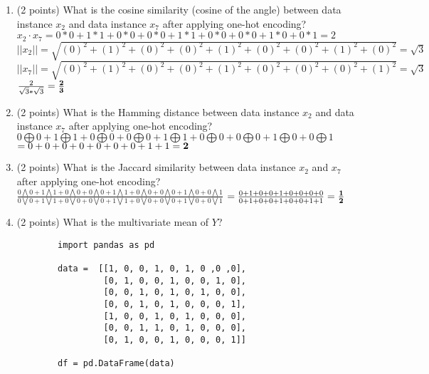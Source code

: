\documentclass[11pt]{article}
\begin{document}
\begin{enumerate}
    \item (2 points) What is the cosine similarity (cosine of the angle)
    between data instance $x_2$ and data instance $x_7$ after applying one-hot
    encoding?
    \newline$x_2 \cdot x_7 = 0*0 + 1*1 + 0*0 + 0*0 + 1*1 + 0*0 + 0*0 + 1*0 + 0*1 = 2$
    \newline$||x_2|| = \sqrt{(0)^2 + (1)^2 + (0)^2 + (0)^2 + (1)^2 + (0)^2 + (0)^2 + (1)^2 + (0)^2} = \sqrt{3} $
    \newline$||x_7|| = \sqrt{(0)^2 + (1)^2 + (0)^2 + (0)^2 + (1)^2 + (0)^2 + (0)^2 + (0)^2 + (1)^2} = \sqrt{3} $
    \newline$\frac{2}{\sqrt{3}*\sqrt{3}} = \bf\frac{2}{3}$
    \newpage
    \item (2 points) What is the Hamming distance between data instance $x_2$
    and data instance $x_7$ after applying one-hot encoding?
    \newline $0\bigoplus0 + 1\bigoplus1 + 0\bigoplus0 + 0\bigoplus0 + 1\bigoplus1 + 0\bigoplus0 + 0\bigoplus0 + 1\bigoplus0 + 0\bigoplus1$
    \newline $=0 + 0 + 0 + 0 + 0 + 0 + 0 + 1 + 1 = \bf2$
    \item (2 points) What is the Jaccard similarity between data instance $x_2$
    and $x_7$ after applying one-hot encoding?
    \newline $\frac{0\bigwedge0 + 1\bigwedge1 + 0\bigwedge0 + 0\bigwedge0 + 1\bigwedge1 + 0\bigwedge0 + 0\bigwedge0 + 1\bigwedge0 + 0\bigwedge1}{0\bigvee0 + 1\bigvee1 + 0\bigvee0 + 0\bigvee0 + 1\bigvee1 + 0\bigvee0 + 0\bigvee0 + 1\bigvee0 + 0\bigvee1}$
    \newline$=\frac{0+1+0+0+1+0+0+0+0}{0+1+0+0+1+0+0+1+1} = \bf\frac{1}{2}$
    \item (2 points) What is the multivariate mean of $Y$?
    \newline \begin{lstlisting}
        import pandas as pd
        
        data =  [[1, 0, 0, 1, 0, 1, 0 ,0 ,0],
                 [0, 1, 0, 0, 1, 0, 0, 1, 0],
                 [0, 0, 1, 0, 1, 0, 1, 0, 0],
                 [0, 0, 1, 0, 1, 0, 0, 0, 1],
                 [1, 0, 0, 1, 0, 1, 0, 0, 0],
                 [0, 0, 1, 1, 0, 1, 0, 0, 0],
                 [0, 1, 0, 0, 1, 0, 0, 0, 1]]
        
        df = pd.DataFrame(data)
        

\end{lstlisting}
\end{enumerate}
\end{document}
